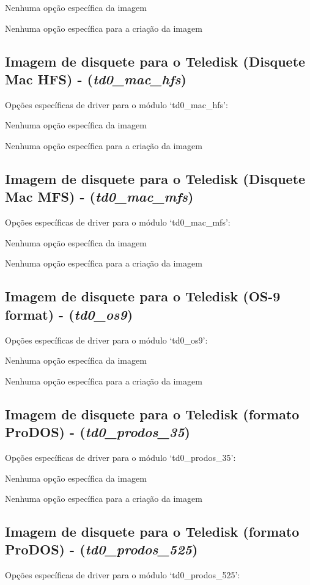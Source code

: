\documentclass[letterpaper,10pt,brazil]{sphinxmanual}
\begin{document}
Nenhuma opção específica da imagem

Nenhuma opção específica para a criação da imagem


\subsection{Imagem de disquete para o Teledisk (Disquete Mac HFS) - (\emph{td0\_mac\_hfs})}
\label{tools/imgtool:imagem-de-disquete-para-o-teledisk-disquete-mac-hfs-td0-mac-hfs}
Opções específicas de driver para o módulo `td0\_mac\_hfs':

Nenhuma opção específica da imagem

Nenhuma opção específica para a criação da imagem


\subsection{Imagem de disquete para o Teledisk (Disquete Mac MFS) - (\emph{td0\_mac\_mfs})}
\label{tools/imgtool:imagem-de-disquete-para-o-teledisk-disquete-mac-mfs-td0-mac-mfs}
Opções específicas de driver para o módulo `td0\_mac\_mfs':

Nenhuma opção específica da imagem

Nenhuma opção específica para a criação da imagem


\subsection{Imagem de disquete para o Teledisk (OS-9 format) - (\emph{td0\_os9})}
\label{tools/imgtool:imagem-de-disquete-para-o-teledisk-os-9-format-td0-os9}
Opções específicas de driver para o módulo `td0\_os9':

Nenhuma opção específica da imagem

Nenhuma opção específica para a criação da imagem


\subsection{Imagem de disquete para o Teledisk (formato ProDOS) - (\emph{td0\_prodos\_35})}
\label{tools/imgtool:imagem-de-disquete-para-o-teledisk-formato-prodos-td0-prodos-35}
Opções específicas de driver para o módulo `td0\_prodos\_35':

Nenhuma opção específica da imagem

Nenhuma opção específica para a criação da imagem


\subsection{Imagem de disquete para o Teledisk (formato ProDOS) - (\emph{td0\_prodos\_525})}
\label{tools/imgtool:imagem-de-disquete-para-o-teledisk-formato-prodos-td0-prodos-525}
Opções específicas de driver para o módulo `td0\_prodos\_525':
\end{document}
